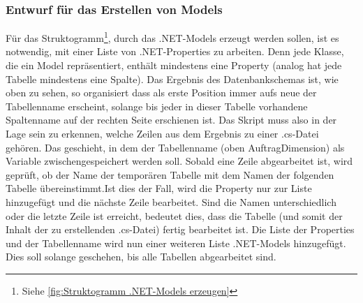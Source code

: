 \documentclass[11pt,toc=sectionentrywithoutdots, 
headheight=44pt, headings=optiontoheadandtoc, hyperfootnotes=false, hypertexnames=false]{scrartcl}
\newcommand\extendedref[1]{Siehe \ref{#1}}
\begin{document}
\subsubsection{Entwurf für das Erstellen von Models}
Für das Struktogramm\footnote{\extendedref{fig:Struktogramm .NET-Models erzeugen}}, durch das .NET-Models erzeugt werden sollen, ist es notwendig, mit einer Liste von .NET-Properties zu arbeiten. Denn jede Klasse, die ein Model repräsentiert, enthält mindestens eine Property (analog hat jede Tabelle mindestens eine Spalte). Das Ergebnis des Datenbankschemas ist, wie oben zu sehen, so organisiert dass als erste Position immer aufs neue der Tabellenname erscheint, solange bis jeder in dieser Tabelle vorhandene Spaltenname auf der rechten Seite erschienen ist. Das Skript muss also in der Lage sein zu erkennen, welche Zeilen aus dem Ergebnis zu einer .cs-Datei gehören. Das geschieht, in dem der Tabellenname (oben \glqq AuftragDimension\grqq{}) als Variable zwischengespeichert werden soll. Sobald eine Zeile abgearbeitet ist, wird geprüft, ob der Name der temporären Tabelle mit dem Namen der folgenden Tabelle übereinstimmt.\newline\newline Ist dies der Fall, wird die Property nur zur Liste hinzugefügt und die nächste Zeile bearbeitet. Sind die Namen unterschiedlich oder die letzte Zeile ist erreicht, bedeutet dies, dass die Tabelle (und somit der Inhalt der zu erstellenden .cs-Datei) fertig bearbeitet ist. Die Liste der Properties und der Tabellenname wird nun einer weiteren Liste .NET-Models hinzugefügt. Dies soll solange geschehen, bis alle Tabellen abgearbeitet sind.
\end{document}
